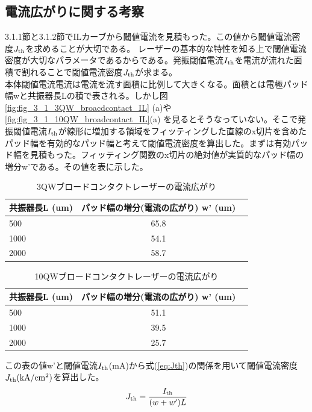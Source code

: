 \subsection{電流広がりに関する考察}%
3.1.1節と3.1.2節でILカーブから閾値電流を見積もった。この値から閾値電流密度$J_{\rm{th}}$を求めることが大切である。
レーザーの基本的な特性を知る上で閾値電流密度が大切なパラメータであるからである。発振閾値電流$I_{\rm{th}}$を電流が流れた面積で割れることで閾値電流密度$J_{\rm{th}}$が求まる。\\
 本体閾値電流電流は電流を流す面積に比例して大きくなる。面積とは電極パッド幅wと共振器長Lの積で表される。しかし図\ref{fig:fig_3_1_3QW_broacdcontact_IL} (a)や\ref{fig:fig_3_1_10QW_broadcontact_IL}(a) を見るとそうなっていない。そこで発振閾値電流$I_{\rm{th}}$が線形に増加する領域をフィッティングした直線のx切片を含めたパッド幅を有効的なパッド幅と考えて閾値電流密度を算出した。まずは有効パッド幅を見積もった。フィッティング関数のx切片の絶対値が実質的なパッド幅の増分w'である。その値を表に示した。
\begin{table}[hbtp]
  \caption{3QWブロードコンタクトレーザーの電流広がり}
  \label{table:table_3QW_broadcontact_w_eff}
  \centering
  \begin{tabular}{lcr}
    \hline
    共振器長L (um)  & パッド幅の増分(電流の広がり) w' (um)   \\
    \hline \hline
     500 & 65.8  \\
    1000  & 54.1 \\
    2000  & 58.7 \\ 
    \hline
  \end{tabular}
\end{table}

\begin{table}[hbtp]
  \caption{10QWブロードコンタクトレーザーの電流広がり}
  \label{table:table_10QW_broadcontact_w_eff}
  \centering
  \begin{tabular}{lcr}
    \hline
    共振器長L (um)  & パッド幅の増分(電流の広がり) w' (um)   \\
    \hline \hline
     500 & 51.1  \\
    1000  & 39.5 \\
    2000  & 25.7 \\ 
    \hline
  \end{tabular}
\end{table}
この表の値w'と閾値電流$I_{\rm{th}}$(mA)から式(\ref{eq:Jth})の関係を用いて閾値電流密度$J_{\rm{th}} \rm{(kA/cm^2)}$を算出した。
\begin{eqnarray}
J_{\rm{th}}=\dfrac{I_{\rm{th}}}{(w+w')L}
\label{eq:Jth}
\end{eqnarray}

